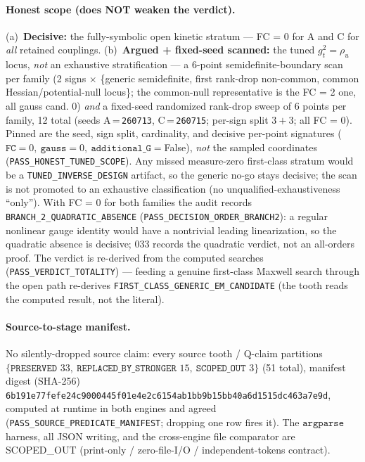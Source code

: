 \paragraph{Honest scope (does NOT weaken the verdict).}
(a)~\textbf{Decisive:} the fully-symbolic open kinetic stratum --- FC = 0 for A and
C for \emph{all} retained couplings. (b)~\textbf{Argued + fixed-seed scanned:} the
tuned \(g_t^2=\rho_u\) locus, \emph{not} an exhaustive stratification --- a 6-point
semidefinite-boundary scan per family (2 signs \(\times\)
\{generic semidefinite, first rank-drop non-common, common Hessian/potential-null
locus\}; the common-null representative is the FC = 2 one, all gauss cand. \(0\))
\emph{and} a fixed-seed randomized rank-drop sweep of 6 points per family, 12 total
(seeds A\,=\,\texttt{260713}, C\,=\,\texttt{260715}; per-sign split \(3+3\); all
FC = 0). Pinned are the seed, sign split, cardinality, and decisive per-point
signatures (\(\texttt{FC}=0,\ \texttt{gauss}=0,\ \texttt{additional\_G}=\)False),
\emph{not} the sampled coordinates
(\texttt{PASS\_HONEST\_TUNED\_SCOPE}). Any missed measure-zero first-class stratum
would be a \texttt{TUNED\_INVERSE\_DESIGN} artifact, so the generic no-go stays
decisive; the scan is not promoted to an exhaustive classification (no
unqualified-exhaustiveness ``only''). With FC = 0 for both families the audit
records \texttt{BRANCH\_2\_QUADRATIC\_ABSENCE}
(\texttt{PASS\_DECISION\_ORDER\_BRANCH2}): a regular nonlinear gauge identity would
have a nontrivial leading linearization, so the quadratic absence is decisive; 033
records the quadratic verdict, not an all-orders proof. The verdict is re-derived
from the computed searches (\texttt{PASS\_VERDICT\_TOTALITY}) --- feeding a genuine
first-class Maxwell search through the open path re-derives
\texttt{FIRST\_CLASS\_GENERIC\_EM\_CANDIDATE} (the tooth reads the computed result,
not the literal).

\paragraph{Source-to-stage manifest.}
No silently-dropped source claim: every source tooth / Q-claim partitions
\(\{\texttt{PRESERVED }33,\ \texttt{REPLACED\_BY\_STRONGER }15,\ \texttt{SCOPED\_OUT }3\}\)
(51 total), manifest digest (SHA-256)
\texttt{6b191e77fefe24c9000445f01e4e2c6154ab1bb9b15bb40a6d1515dc463a7e9d}, computed
at runtime in both engines and agreed (\texttt{PASS\_SOURCE\_PREDICATE\_MANIFEST};
dropping one row fires it). The \(\texttt{argparse}\) harness, all JSON writing, and
the cross-engine file comparator are SCOPED\_OUT (print-only / zero-file-I/O /
independent-tokens contract).

